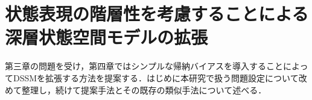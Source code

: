 \documentclass[10pt, twocolumn]{jarticle}
\begin{document}



\section{状態表現の階層性を考慮することによる深層状態空間モデルの拡張}
\label{chap:proposal}

第三章の問題を受け，第四章ではシンプルな帰納バイアスを導入することによってDSSMを拡張する方法を提案する．はじめに本研究で扱う問題設定について改めて整理し，続けて提案手法とその既存の類似手法について述べる．



\end{document}
